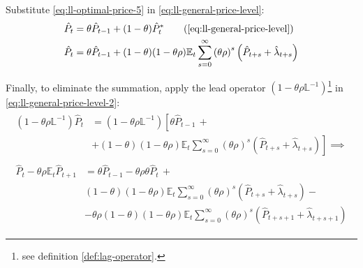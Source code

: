 \documentclass[
	12pt,
	]{article}
\numberwithin{equation}{section}
\newcommand{\E}[1][t]{{\mathbb{E}_{#1}}}
\theoremstyle{definition}
\theoremstyle{plain}
\theoremstyle{plain}
\theoremstyle{plain}
\begin{document}
Substitute \ref{eq:ll-optimal-price-5} in \ref{eq:ll-general-price-level}:
\begin{align}
	\hat{P}_t &= \theta \hat{P}_{t-1} + (1-\theta) \hat{P}_t^\ast \tag{\ref{eq:ll-general-price-level}}\\
	\hat{P}_t &= \theta \hat{P}_{t-1} + (1-\theta) (1- \theta \rho) \E \sum_{s=0}^{\infty} \left( \theta \rho \right)^s \left( \hat{P}_{t+s} + \hat{\lambda}_{t+s} \right) \label{eq:ll-general-price-level-2}
\end{align}

Finally, to eliminate the summation, apply the lead operator $(1- \theta \rho \mathbb{L}^{-1})$\footnote{see definition \ref{def:lag-operator}.} in \ref{eq:ll-general-price-level-2}:
\begin{align}
	\begin{split}
		(1- \theta \rho \mathbb{L}^{-1}) \hat{P}_t &= (1- \theta \rho \mathbb{L}^{-1}) \left[ \theta \hat{P}_{t-1} \, + \right. \\
		&\left. + (1-\theta) (1- \theta \rho) \E \sum_{s=0}^{\infty} \left( \theta \rho \right)^s \left( \hat{P}_{t+s} + \hat{\lambda}_{t+s} \right) \right] \implies \nonumber
	\end{split} \\
	\begin{split}
		\hat{P}_t - \theta \rho \E \hat{P}_{t+1} &= \theta \hat{P}_{t-1} - \theta \rho \theta \hat{P}_t \, + \\
		& (1-\theta) (1- \theta \rho) \E \sum_{s=0}^{\infty} \left( \theta \rho \right)^s \left( \hat{P}_{t+s} + \hat{\lambda}_{t+s} \right) - \\
		& - \theta \rho (1-\theta) (1- \theta \rho) \E \sum_{s=0}^{\infty} \left( \theta \rho \right)^s \left( \hat{P}_{t+s+1} + \hat{\lambda}_{t+s+1} \right)
	\end{split} \label{eq:ll-general-price-level-3}
\end{align}
\end{document}
